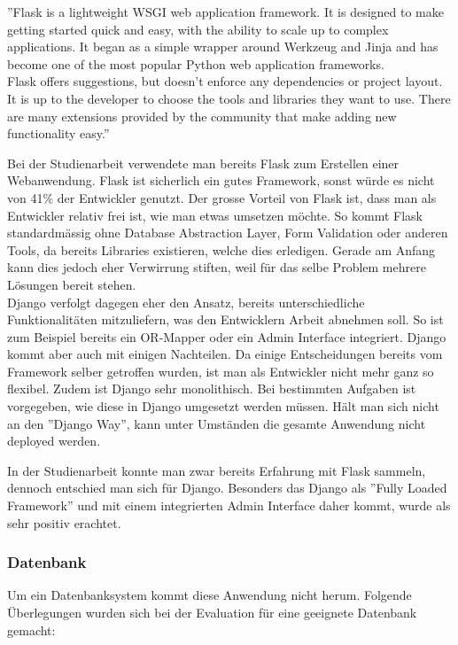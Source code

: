 ''Flask is a lightweight WSGI web application framework. It is designed to make getting started quick and easy, with the ability to scale up to complex applications. It began as a simple wrapper around Werkzeug and Jinja and has become one of the most popular Python web application frameworks. \\
Flask offers suggestions, but doesn't enforce any dependencies or project layout. It is up to the developer to choose the tools and libraries they want to use. There are many extensions provided by the community that make adding new functionality easy.''

Bei der Studienarbeit verwendete man bereits Flask zum Erstellen einer Webanwendung. Flask ist sicherlich ein gutes Framework, sonst würde es nicht von 41\% der Entwickler genutzt. Der grosse Vorteil von Flask ist, dass man als Entwickler relativ frei ist, wie man etwas umsetzen möchte. So kommt Flask standardmässig ohne Database Abstraction Layer, Form Validation oder anderen Tools, da bereits Libraries existieren, welche dies erledigen. Gerade am Anfang kann dies jedoch eher Verwirrung stiften, weil für das selbe Problem mehrere Lösungen bereit stehen. \\

Django verfolgt dagegen eher den Ansatz, bereits unterschiedliche Funktionalitäten mitzuliefern, was den Entwicklern Arbeit abnehmen soll. So ist zum Beispiel bereits ein OR-Mapper oder ein Admin Interface integriert. 
Django kommt aber auch mit einigen Nachteilen. Da einige Entscheidungen bereits vom Framework selber getroffen wurden, ist man als Entwickler nicht mehr ganz so flexibel. Zudem ist Django sehr monolithisch. Bei bestimmten Aufgaben ist vorgegeben, wie diese in Django umgesetzt werden müssen. Hält man sich nicht an den ''Django Way'', kann unter Umständen die gesamte Anwendung nicht deployed werden.


In der Studienarbeit konnte man zwar bereits Erfahrung mit Flask sammeln, dennoch entschied man sich für Django. Besonders das Django als ''Fully Loaded Framework'' und mit einem integrierten Admin Interface daher kommt, wurde als sehr positiv erachtet.


\subsubsection*{Datenbank}
Um ein Datenbanksystem kommt diese Anwendung nicht herum. Folgende Überlegungen wurden sich bei der Evaluation für eine geeignete Datenbank gemacht:

